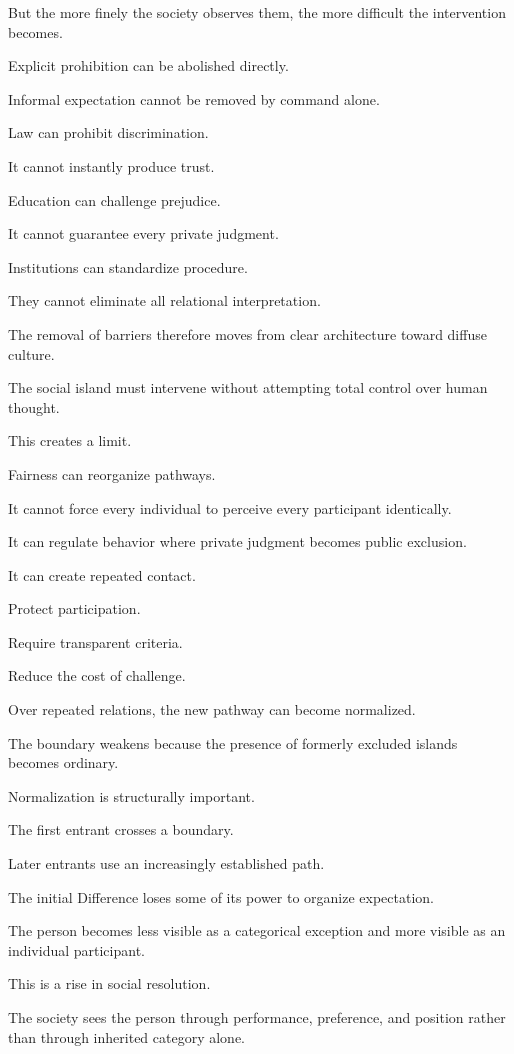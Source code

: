 But the more finely the society observes them, the more difficult the intervention becomes.

Explicit prohibition can be abolished directly.

Informal expectation cannot be removed by command alone.

Law can prohibit discrimination.

It cannot instantly produce trust.

Education can challenge prejudice.

It cannot guarantee every private judgment.

Institutions can standardize procedure.

They cannot eliminate all relational interpretation.

The removal of barriers therefore moves from clear architecture toward diffuse culture.

The social island must intervene without attempting total control over human thought.

This creates a limit.

Fairness can reorganize pathways.

It cannot force every individual to perceive every participant identically.

It can regulate behavior where private judgment becomes public exclusion.

It can create repeated contact.

Protect participation.

Require transparent criteria.

Reduce the cost of challenge.

Over repeated relations, the new pathway can become normalized.

The boundary weakens because the presence of formerly excluded islands becomes ordinary.

Normalization is structurally important.

The first entrant crosses a boundary.

Later entrants use an increasingly established path.

The initial Difference loses some of its power to organize expectation.

The person becomes less visible as a categorical exception and more visible as an individual participant.

This is a rise in social resolution.

The society sees the person through performance, preference, and position rather than through inherited category alone.

